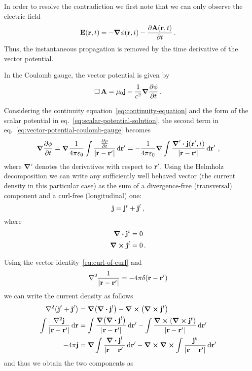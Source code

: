 \documentclass[12pt, class=report, crop=false]{standalone}
\begin{document}
In order to resolve the contradiction we first note that we can only observe
the electric field
\[
  \vb{E}(\vb{r}, t) = -\grad{\phi}(\vb{r},t) -\pdv{\vb{A}(\vb{r},t)}{t}\,.
\]
Thus, the instantaneous propagation is removed by the time derivative
of the vector potential.

In the Coulomb gauge, the vector potential is given by
\begin{equation}
  \label{eq:vector-potential-coulomb-gauge}
  \operatorname{\Box} \vb{A} = \mu_0 \vb{j} - \frac{1}{c^2} \grad{\pdv{\phi}{t}}\,.
\end{equation}

Considering the continuity equation~\eqref{eq:continuity-equation} and
the form of the scalar potential in eq.~\eqref{eq:scalar-potential-solution},
the second term in eq.~\eqref{eq:vector-potential-coulomb-gauge} becomes
\begin{equation}
  \label{eq:scalar-potential-continuity-equation}
  \grad{\pdv{\phi}{t}} = \grad \frac{1}{4\pi \varepsilon_0}
    \int \frac{\pdv{\rho}{t}}{|\vb{r}-\vb{r}'|} \dd{\vb{r}}'
    = - \frac{1}{4\pi \varepsilon_0} \grad
    \int \frac{\boldsymbol{\nabla}' \vdot \vb{j}(\vb{r}',t)}{|\vb{r}-\vb{r}'|} \dd{\vb{r}}'\,,
\end{equation}
where \(\boldsymbol{\nabla}'\) denotes the derivatives with respect to \(\vb{r}'\).
Using the Helmholz decomposition we can write any sufficiently well behaved
vector (the current density in this particular case) as the sum
of a divergence-free (transversal) component and a curl-free (longitudinal) one:
\[
  \vb{j} = \vb{j}^t + \vb{j}^l \,,
\]
where
\begin{align*}
  \div{\vb{j}^t} &= 0 \\
  \curl{\vb{j}^l} &= 0 \,.
\end{align*}

Using the vector identity~\eqref{eq:curl-of-curl} and
\[
  \laplacian{\frac{1}{|\vb{r}-\vb{r}'|}} = -4\pi \delta(\vb{r}-\vb{r}')
\]
we can write the current density as follows
\begin{align*}
  \laplacian(\vb{j}^t + \vb{j}^l) &= \grad(\div{\vb{j}^l}) - \curl(\curl{\vb{j}^t}) \\
  \int \frac{\laplacian{\vb{j}}}{|\vb{r}-\vb{r}'|} \dd{\vb{r}} &=
    \int \frac{\grad(\div{\vb{j}^l})}{|\vb{r}-\vb{r}'|} \dd{\vb{r}'}
    - \int \frac{\curl(\curl{\vb{j}^t})}{|\vb{r}-\vb{r}'|} \dd{\vb{r}'} \\
  -4\pi \vb{j} &= \grad \int \frac{\div{\vb{j}^l}}{|\vb{r}-\vb{r}'|} \dd{\vb{r}'}
    - \curl \curl \int \frac{\vb{j^t}}{|\vb{r}-\vb{r}'|} \dd{\vb{r}'}
\end{align*}
and thus we obtain the two components as
\end{document}
